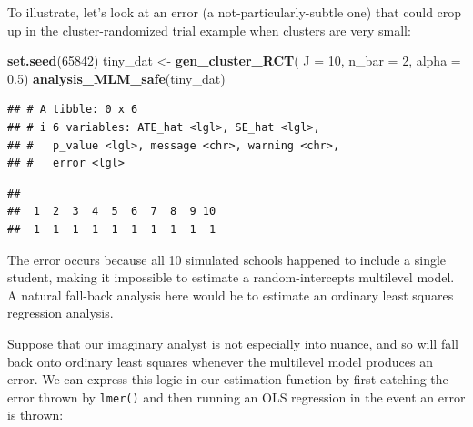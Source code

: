 \documentclass[
]{book}
\newenvironment{Shaded}{\begin{snugshade}}{\end{snugshade}}
\newcommand{\AttributeTok}[1]{\textcolor[rgb]{0.13,0.29,0.53}{#1}}
\newcommand{\DecValTok}[1]{\textcolor[rgb]{0.00,0.00,0.81}{#1}}
\newcommand{\FloatTok}[1]{\textcolor[rgb]{0.00,0.00,0.81}{#1}}
\newcommand{\FunctionTok}[1]{\textcolor[rgb]{0.13,0.29,0.53}{\textbf{#1}}}
\newcommand{\NormalTok}[1]{#1}
\newcommand{\OtherTok}[1]{\textcolor[rgb]{0.56,0.35,0.01}{#1}}
\newcommand{\SpecialCharTok}[1]{\textcolor[rgb]{0.81,0.36,0.00}{\textbf{#1}}}
\begin{document}
To illustrate, let's look at an error (a not-particularly-subtle one) that could crop up in the cluster-randomized trial example when clusters are very small:

\begin{Shaded}
\begin{Highlighting}[]
\FunctionTok{set.seed}\NormalTok{(}\DecValTok{65842}\NormalTok{)}
\NormalTok{tiny\_dat }\OtherTok{\textless{}{-}} \FunctionTok{gen\_cluster\_RCT}\NormalTok{( }\AttributeTok{J =} \DecValTok{10}\NormalTok{, }\AttributeTok{n\_bar =} \DecValTok{2}\NormalTok{, }\AttributeTok{alpha =} \FloatTok{0.5}\NormalTok{)}
\FunctionTok{analysis\_MLM\_safe}\NormalTok{(tiny\_dat)}
\end{Highlighting}
\end{Shaded}

\begin{verbatim}
## # A tibble: 0 x 6
## # i 6 variables: ATE_hat <lgl>, SE_hat <lgl>,
## #   p_value <lgl>, message <chr>, warning <chr>,
## #   error <lgl>
\end{verbatim}

\begin{Shaded}
\end{Shaded}

\begin{verbatim}
## 
##  1  2  3  4  5  6  7  8  9 10 
##  1  1  1  1  1  1  1  1  1  1
\end{verbatim}

The error occurs because all 10 simulated schools happened to include a single student, making it impossible to estimate a random-intercepts multilevel model.
A natural fall-back analysis here would be to estimate an ordinary least squares regression analysis.

Suppose that our imaginary analyst is not especially into nuance, and so will fall back onto ordinary least squares whenever the multilevel model produces an error.
We can express this logic in our estimation function by first catching the error thrown by \texttt{lmer()} and then running an OLS regression in the event an error is thrown:
\end{document}
